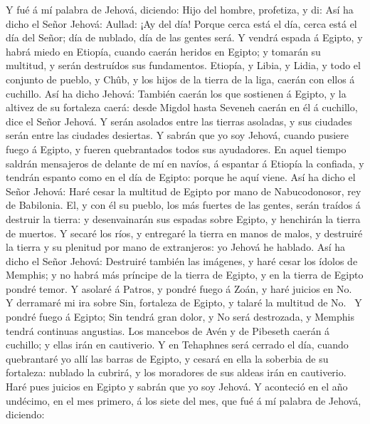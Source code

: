  Y fué á mí palabra de Jehová, diciendo: 
Hijo del hombre, profetiza, y di: Así ha dicho el Señor Jehová: Aullad:
¡Ay del día!  Porque cerca está el día, cerca está el día
del Señor; día de nublado, día de las gentes será.  Y
vendrá espada á Egipto, y habrá miedo en Etiopía, cuando caerán heridos
en Egipto; y tomarán su multitud, y serán destruídos sus fundamentos.
 Etiopía, y Libia, y Lidia, y todo el conjunto de pueblo,
y Chûb, y los hijos de la tierra de la liga, caerán con ellos á
cuchillo.  Así ha dicho Jehová: También caerán los que
sostienen á Egipto, y la altivez de su fortaleza caerá: desde Migdol
hasta Seveneh caerán en él á cuchillo, dice el Señor Jehová.
 Y serán asolados entre las tierras asoladas, y sus
ciudades serán entre las ciudades desiertas.  Y sabrán que
yo soy Jehová, cuando pusiere fuego á Egipto, y fueren quebrantados
todos sus ayudadores.  En aquel tiempo saldrán mensajeros
de delante de mí en navíos, á espantar á Etiopía la confiada, y tendrán
espanto como en el día de Egipto: porque he aquí viene. 
Así ha dicho el Señor Jehová: Haré cesar la multitud de Egipto por mano
de Nabucodonosor, rey de Babilonia.  El, y con él su
pueblo, los más fuertes de las gentes, serán traídos á destruir la
tierra: y desenvainarán sus espadas sobre Egipto, y henchirán la tierra
de muertos.  Y secaré los ríos, y entregaré la tierra en
manos de malos, y destruiré la tierra y su plenitud por mano de
extranjeros: yo Jehová he hablado.  Así ha dicho el Señor
Jehová: Destruiré también las imágenes, y haré cesar los ídolos de
Memphis; y no habrá más príncipe de la tierra de Egipto, y en la tierra
de Egipto pondré temor.  Y asolaré á Patros, y pondré
fuego á Zoán, y haré juicios en No.~ Y derramaré mi ira
sobre Sin, fortaleza de Egipto, y talaré la multitud de
No.~ Y pondré fuego á Egipto; Sin tendrá gran dolor, y No
será destrozada, y Memphis tendrá continuas angustias. 
Los mancebos de Avén y de Pibeseth caerán á cuchillo; y ellas irán en
cautiverio.  Y en Tehaphnes será cerrado el día, cuando
quebrantaré yo allí las barras de Egipto, y cesará en ella la soberbia
de su fortaleza: nublado la cubrirá, y los moradores de sus aldeas irán
en cautiverio.  Haré pues juicios en Egipto y sabrán que
yo soy Jehová.  Y aconteció en el año undécimo, en el mes
primero, á los siete del mes, que fué á mí palabra de Jehová, diciendo:
